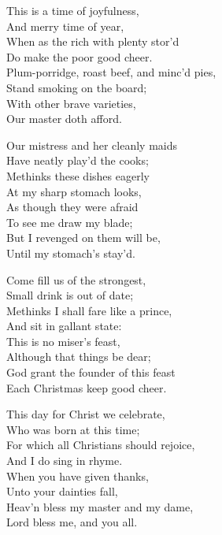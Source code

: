 

\settowidth{\versewidth}{Plum-porridge, roast beef, and minc’d pies,}
\begin{dcverse}\begin{altverse}
This is a time of joyfulness,\\
And merry time of year,\\
When as the rich with plenty stor’d\\
Do make the poor good cheer.\\
Plum-porridge, roast beef, and minc’d pies,\\
Stand smoking on the board;\\
With other brave varieties,\\
Our master doth afford.
\end{altverse}

\begin{altverse}
Our mistress and her cleanly maids\\
Have neatly play’d the cooks;\\
Methinks these dishes eagerly\\
At my sharp stomach looks,\\
As though they were afraid\\
To see me draw my blade;\\
But I revenged on them will be,\\
Until my stomach’s stay’d.
\end{altverse}

\begin{altverse}
Come fill us of the strongest,\\
Small drink is out of date;\\
Methinks I shall fare like a prince,\\
And sit in gallant state:\\
This is no miser’s feast,\\
Although that things be dear;\\
God grant the founder of this feast\\
Each Christmas keep good cheer.
\end{altverse}

\begin{altverse}
This day for Christ we celebrate,\\
Who was born at this time;\\
For which all Christians should rejoice,\\
And I do sing in rhyme.\\
When you have given thanks,\\
Unto your dainties fall,\\
Heav’n bless my master and my dame,\\
Lord bless me, and you all.
\end{altverse}
\end{dcverse}
\pagebreak


